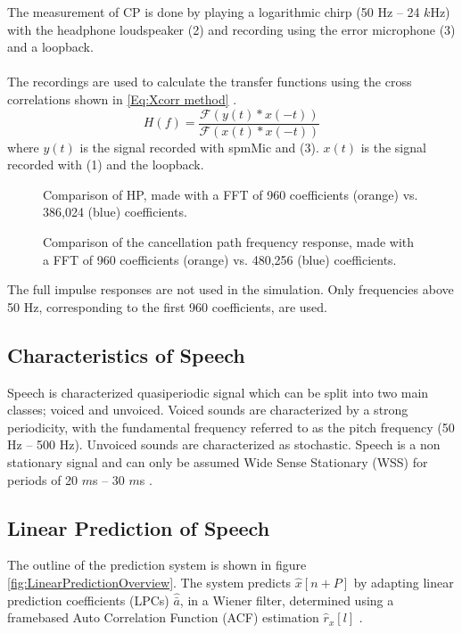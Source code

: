 The measurement of CP is done by playing a logarithmic chirp (50 Hz -- 24 $k$Hz) with the headphone loudspeaker (2) and recording using the error microphone (3) and a loopback.
\\\\
The recordings are used to calculate the transfer functions using the cross correlations shown in \autoref{Eq:Xcorr method} \cite{TutorialMeasurementPowerSpectra}.   
\begin{equation}
H(f)=\dfrac{\mathscr{F}(y(t)\ast x(-t))} {\mathscr{F}(x(t)\ast x(-t))}
\label{Eq:Xcorr method}
\end{equation}
where $y(t)$ is the signal recorded with spmMic and (3). $x(t)$ is the signal recorded with (1) and the loopback.    
\begin{figure}[H]
	\centering
	
	\caption{Comparison of HP, made with a FFT of 960 coefficients (orange) vs. 386,024 (blue) coefficients.}
	\label{CancellationPathImpulseResponseCompare}
\end{figure}

\begin{figure}[H]
	\centering
	
	\caption{Comparison of the cancellation path frequency response, made with a FFT of 960 coefficients (orange) vs. 480,256 (blue) coefficients.}
	\label{CancellationPathImpulseResponseCompare}
\end{figure}
The full impulse responses are not used in the simulation. Only frequencies above 50 Hz, corresponding to the first 960 coefficients, are used.

\subsection{Characteristics of Speech}
Speech is characterized quasiperiodic signal which can be split into two main classes; voiced and unvoiced. Voiced sounds are characterized by a strong periodicity, with the fundamental frequency referred to as the pitch frequency (50 Hz -- 500 Hz). Unvoiced sounds are characterized as stochastic. Speech is a non stationary signal and can only be assumed Wide Sense Stationary (WSS) for periods of 20 $m$s -- 30 $m$s \cite{Speech}. 

\subsection{Linear Prediction of Speech}
The outline of the prediction system is shown in figure \ref{fig:LinearPredictionOverview}. The system predicts $\hat{x}[n+P]$ by adapting linear prediction coefficients (LPCs) $\hat{\bar{a}}$, in a Wiener filter, determined using a framebased Auto Correlation Function (ACF) estimation $\hat{r}_x[l]$ \cite{LinearPrediction}.   


